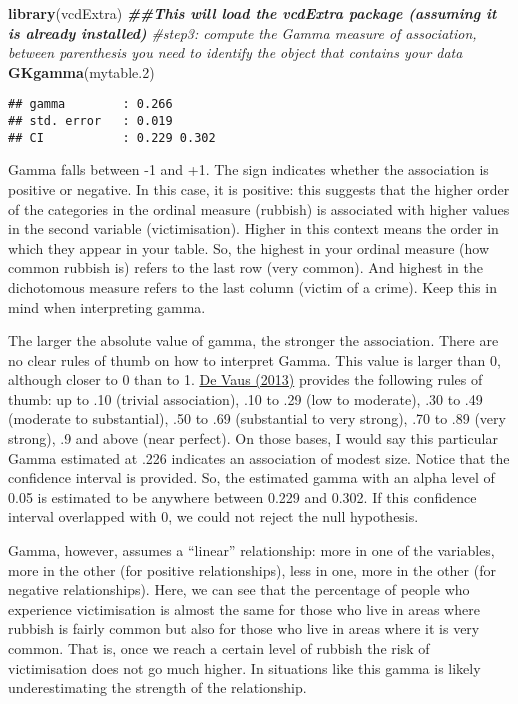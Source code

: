 \documentclass[
]{book}
\newenvironment{Shaded}{\begin{snugshade}}{\end{snugshade}}
\newcommand{\CommentTok}[1]{\textcolor[rgb]{0.56,0.35,0.01}{\textit{#1}}}
\newcommand{\DocumentationTok}[1]{\textcolor[rgb]{0.56,0.35,0.01}{\textbf{\textit{#1}}}}
\newcommand{\FloatTok}[1]{\textcolor[rgb]{0.00,0.00,0.81}{#1}}
\newcommand{\FunctionTok}[1]{\textcolor[rgb]{0.13,0.29,0.53}{\textbf{#1}}}
\newcommand{\NormalTok}[1]{#1}
\begin{document}
\begin{Shaded}
\begin{Highlighting}[]
\FunctionTok{library}\NormalTok{(vcdExtra) }\DocumentationTok{\#\#This will load the vcdExtra package (assuming it is already installed)}
\CommentTok{\#step3: compute the Gamma measure of association, between parenthesis you need to identify the object that contains your data}
\FunctionTok{GKgamma}\NormalTok{(mytable}\FloatTok{.2}\NormalTok{)}
\end{Highlighting}
\end{Shaded}

\begin{verbatim}
## gamma        : 0.266 
## std. error   : 0.019 
## CI           : 0.229 0.302
\end{verbatim}

Gamma falls between -1 and +1. The sign indicates whether the association is positive or negative. In this case, it is positive: this suggests that the higher order of the categories in the ordinal measure (rubbish) is associated with higher values in the second variable (victimisation). Higher in this context means the order in which they appear in your table. So, the highest in your ordinal measure (how common rubbish is) refers to the last row (very common). And highest in the dichotomous measure refers to the last column (victim of a crime). Keep this in mind when interpreting gamma.

The larger the absolute value of gamma, the stronger the association. There are no clear rules of thumb on how to interpret Gamma. This value is larger than 0, although closer to 0 than to 1. \href{https://www.taylorfrancis.com/books/mono/10.4324/9780203519196/surveys-social-research-david-de-vaus-david-de-vaus}{De Vaus (2013)} provides the following rules of thumb: up to .10 (trivial association), .10 to .29 (low to moderate), .30 to .49 (moderate to substantial), .50 to .69 (substantial to very strong), .70 to .89 (very strong), .9 and above (near perfect). On those bases, I would say this particular Gamma estimated at .226 indicates an association of modest size. Notice that the confidence interval is provided. So, the estimated gamma with an alpha level of 0.05 is estimated to be anywhere between 0.229 and 0.302. If this confidence interval overlapped with 0, we could not reject the null hypothesis.

Gamma, however, assumes a ``linear'' relationship: more in one of the variables, more in the other (for positive relationships), less in one, more in the other (for negative relationships). Here, we can see that the percentage of people who experience victimisation is almost the same for those who live in areas where rubbish is fairly common but also for those who live in areas where it is very common. That is, once we reach a certain level of rubbish the risk of victimisation does not go much higher. In situations like this gamma is likely underestimating the strength of the relationship.
\end{document}
